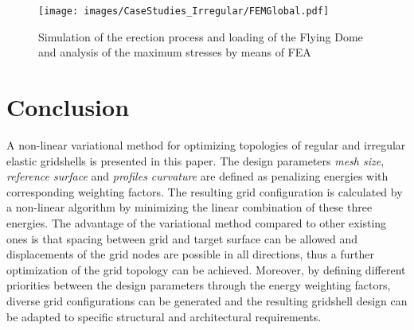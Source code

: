 \documentclass[Thesis.tex]{subfiles}
\begin{document}
\begin{figure}
\centering
\texttt{[image: images/CaseStudies\_Irregular/FEMGlobal.pdf]}
\caption{Simulation of the erection process and loading of the Flying Dome and analysis of the maximum stresses by means of FEA}
\label{fig:FEMGlobal}
\end{figure}


\section{Conclusion}

A non-linear variational method for optimizing topologies of regular and irregular elastic gridshells is presented in this paper. The design parameters {\it mesh size}, {\it reference surface} and {\it profiles curvature} are defined as penalizing energies with corresponding weighting factors. The resulting grid configuration is calculated by a non-linear algorithm by minimizing the linear combination of these three energies. The advantage of the variational method compared to other existing ones is that spacing between grid and target surface can be allowed and displacements of the grid nodes are possible in all directions, thus a further optimization of the grid topology can be achieved. Moreover, by defining different priorities between the design parameters through the energy weighting factors, diverse grid configurations can be generated and the resulting gridshell design can be adapted to specific structural and architectural requirements. 


\subfilebibliography
\end{document}
